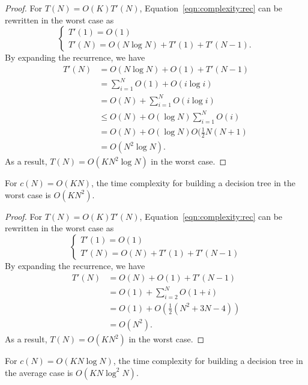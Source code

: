 \begin{proof}
For $T(N) = O(K)T'(N)$, Equation~\ref{eqn:complexity:rec}
can be rewritten in the worst case as
\begin{equation}
\begin{cases}
T'(1) = O(1) \\
T'(N) = O(N\log N) +  T'(1) + T'(N-1).
\end{cases}
\end{equation}
By expanding the recurrence, we have
\begin{align}
T'(N) &= O(N\log N) + O(1) + T'(N-1) \nonumber \\
      &= \sum_{i=1}^N O(1) + O(i\log i) \nonumber \\
      &= O(N) + \sum_{i=1}^N O(i\log i) \nonumber \\
      &\leq O(N) + O(\log N) \sum_{i=1}^N O(i) \nonumber \\
      &= O(N) + O(\log N) O(\frac{1}{2} N(N+1) \nonumber \\
      &= O(N^2 \log N).
\end{align}
As a result, $T(N) = O(K N^2 \log N)$ in the worst case.
\end{proof}

\begin{theorem}\label{thm:6:worst:kn}
For $c(N)=O(K N)$, the time complexity for building a decision
tree in the worst case is $O(K N^2)$.
\end{theorem}

\begin{proof}
For $T(N) = O(K)T'(N)$, Equation~\ref{eqn:complexity:rec}
can be rewritten in the worst case as
\begin{equation}
\begin{cases}
T'(1) = O(1) \\
T'(N) = O(N) +  T'(1) + T'(N-1)
\end{cases}
\end{equation}
By expanding the recurrence, we have
\begin{align}
T'(N) &= O(N) + O(1) + T'(N-1) \nonumber \\
      &= O(1) + \sum_{i=2}^N O(1+i) \nonumber \\
      &= O(1) + O(\frac{1}{2} (N^2 + 3N - 4)) \nonumber \\
      &= O(N^2).
\end{align}
As a result, $T(N) = O(K N^2)$ in the worst case.
\end{proof}

\begin{theorem}\label{thm:6:average:knlogn}
For $c(N)=O(K N\log N)$, the time complexity for building a decision
tree in the average case is $O(K N \log^2 N)$.
\end{theorem}

